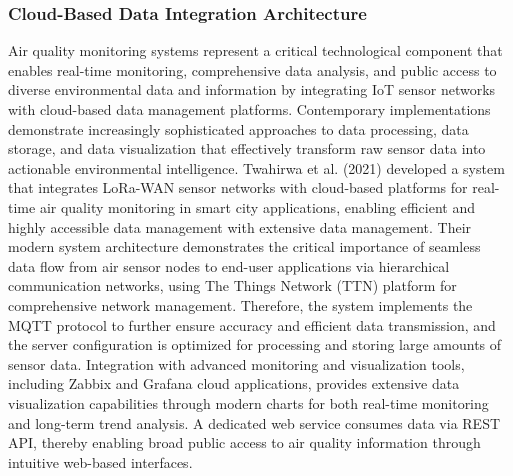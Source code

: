 \documentclass[conference]{IEEEtran}
\begin{document}
\subsubsection{Cloud-Based Data Integration Architecture}
Air quality monitoring systems represent a critical technological component that enables real-time monitoring, comprehensive data analysis, and public access to diverse environmental data and information by integrating IoT sensor networks with cloud-based data management platforms.
Contemporary implementations demonstrate increasingly sophisticated approaches to data processing, data storage, and data visualization that effectively transform raw sensor data into actionable environmental intelligence. Twahirwa et al. (2021) developed a system that integrates LoRa-WAN sensor networks with cloud-based platforms for real-time air quality monitoring in smart city applications, enabling efficient and highly accessible data management with extensive data management. Their modern system architecture demonstrates the critical importance of seamless data flow from air sensor nodes to end-user applications via hierarchical communication networks, using The Things Network (TTN) platform for comprehensive network management. Therefore, the system implements the MQTT protocol to further ensure accuracy and efficient data transmission, and the server configuration is optimized for processing and storing large amounts of sensor data. Integration with advanced monitoring and visualization tools, including Zabbix and Grafana cloud applications, provides extensive data visualization capabilities through modern charts for both real-time monitoring and long-term trend analysis. A dedicated web service consumes data via REST API, thereby enabling broad public access to air quality information through intuitive web-based interfaces.~\cite{twahirwa2021}
\end{document}
